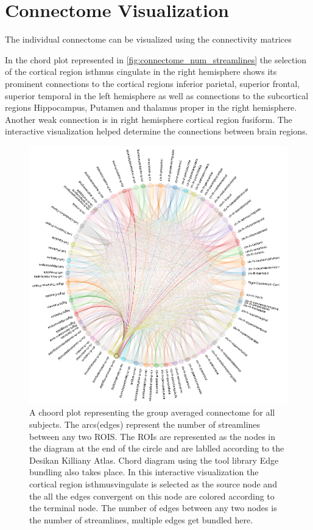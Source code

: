 \documentclass[msthesis.tex]{subfiles}
\begin{document}
\section{Connectome Visualization}

The individual connectome can be visualized using the connectivity matrices

In the chord plot represented in \autoref{fig:connectome_num_streamlines} the selection of the cortical region isthmus cingulate in the right hemisphere shows its prominent connections to the cortical regions inferior parietal, superior frontal, superior temporal in the left hemisphere as well as connections to the subcortical regions Hippocampus, Putamen and thalamus proper in the right hemisphere. Another weak connection is in right hemisphere cortical region fusiform. The interactive visualization helped determine the connections between brain regions. 
\label{sec:connectome_generation}
\begin{figure}
    \centering
    \includegraphics[width=\textwidth]{images/bokeh_plot_allsubjects.png}
    \caption{A choord plot representing the group averaged connectome for all subjects. The arcs(edges) represent the number of streamlines between any two ROIS. The ROIs are represented as the nodes in the diagram at the end of the circle and are lablled according to the Desikan Killiany Atlas. Chord diagram using the tool library Edge bundling also takes place. In this interactive visualization the cortical region isthmusvingulate is selected as the source node and the all the edges convergent on this node are colored according to the terminal node. The number of edges between any two nodes is the number of streamlines, multiple edges get bundled here.}
    \label{fig:connectome_num_streamlines}
\end{figure}
\end{document}
